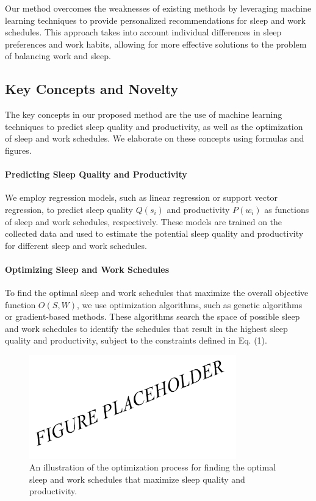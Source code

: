 Our method overcomes the weaknesses of existing methods by leveraging machine learning techniques to provide personalized recommendations for sleep and work schedules. This approach takes into account individual differences in sleep preferences and work habits, allowing for more effective solutions to the problem of balancing work and sleep.

\subsection{Key Concepts and Novelty}

The key concepts in our proposed method are the use of machine learning techniques to predict sleep quality and productivity, as well as the optimization of sleep and work schedules. We elaborate on these concepts using formulas and figures.

\paragraph{Predicting Sleep Quality and Productivity}

We employ regression models, such as linear regression or support vector regression, to predict sleep quality $Q(s_i)$ and productivity $P(w_i)$ as functions of sleep and work schedules, respectively. These models are trained on the collected data and used to estimate the potential sleep quality and productivity for different sleep and work schedules.

\paragraph{Optimizing Sleep and Work Schedules}

To find the optimal sleep and work schedules that maximize the overall objective function $O(S, W)$, we use optimization algorithms, such as genetic algorithms or gradient-based methods. These algorithms search the space of possible sleep and work schedules to identify the schedules that result in the highest sleep quality and productivity, subject to the constraints defined in Eq. (1).

\begin{figure}[ht]
\centering
\includegraphics[width=0.8\textwidth]{fig1.png}
\caption{An illustration of the optimization process for finding the optimal sleep and work schedules that maximize sleep quality and productivity.}
\label{fig:optimization}
\end{figure}

